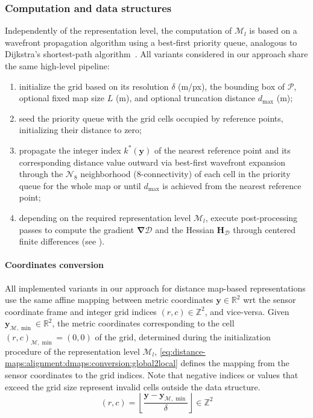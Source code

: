 \subsubsection{Computation and data structures}
\label{sec:distance-maps:alignment:dmaps:computation}
Independently of the representation level, the computation of $\mathcal{M}_l$
is based on a wavefront propagation algorithm using a best-first priority queue,
analogous to Dijkstra's shortest-path algorithm~\cite{dijkstra:nm:1959}.
All variants considered in our approach share the same high-level pipeline:
\begin{enumerate}[nosep]
\item initialize the grid based on its resolution $\delta$ (m/px),
      the bounding box of $\mathcal{P}$, optional fixed map size $L$ (m), and
      optional truncation distance $d_{\max}$ (m);
\item seed the priority queue with the grid cells occupied by reference
      points, initializing their distance to zero;
\item propagate the integer index $k^*(\mathbf{y})$ of the nearest
      reference point and its corresponding distance value outward via
      best-first wavefront expansion through the $\mathcal{N}_8$ neighborhood
      (8-connectivity) of each cell in the priority queue for the whole map or
      until $d_{\max}$ is achieved from the nearest reference point;
\item depending on the required representation level
      $\mathcal{M}_l$, execute post-processing passes to compute the
      gradient $\bm{\nabla}\mathcal{D}$ and the Hessian
      $\mathbf{H}_{\mathcal{D}}$ through centered finite differences
      (see ).
\end{enumerate}

\paragraph{Coordinates conversion}
All implemented variants in our approach for distance map-based representations
use the same affine mapping between metric coordinates
$\mathbf{y}\in\mathbb{R}^2$ \gls{wrt} the sensor coordinate frame and
integer grid indices $(r,c)\in\mathbb{Z}^2$,
and vice-versa. Given $\mathbf{y}_{\mathcal{M},\min}\in\mathbb{R}^2$,
the metric coordinates corresponding to the cell
$(r,c)_{\mathcal{M},\min}=(0,0)$ of the grid, determined during
the initialization procedure of the representation level $\mathcal{M}_l$,
\eqref{eq:distance-maps:alignment:dmaps:conversion:global2local} defines
the mapping from the sensor coordinates to the grid indices.
Note that negative indices or values that exceed the grid size
represent invalid cells outside the data structure.
\begin{equation}
\label{eq:distance-maps:alignment:dmaps:conversion:global2local}
(r, c) =
\left\lfloor\frac{\mathbf{y} - \mathbf{y}_{\mathcal{M},\min}}{\delta}\right\rfloor
\in\mathbb{Z}^2
\end{equation}

